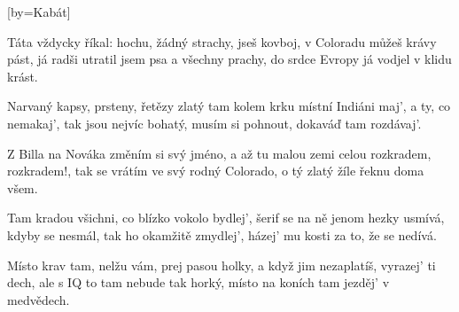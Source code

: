 [by={Kabát}]

\beginverse*{}
   
    
\endverse{}

\beginverse{}
Táta vždycky říkal: hochu, žádný strachy,
jseš kovboj, v Coloradu můžeš krávy pást,
já radši utratil jsem psa a všechny prachy,
do srdce Evropy já vodjel v klidu krást.
\endverse{}

\beginverse{}
Narvaný kapsy, prsteny, řetězy zlatý
tam kolem krku místní Indiáni maj',
a ty, co nemakaj', tak jsou nejvíc bohatý,
musím si pohnout, dokaváď tam rozdávaj'.
\endverse{}

\beginchorus{}
Z Billa na Nováka změním si svý jméno,
a až tu malou zemi celou rozkradem, rozkradem!,
tak se vrátím ve svý rodný Colorado,
o tý zlatý žíle řeknu doma všem.
\endchorus{}

\beginverse{}
Tam kradou všichni, co blízko vokolo bydlej',
šerif se na ně jenom hezky usmívá,
kdyby se nesmál, tak ho okamžitě zmydlej',
házej' mu kosti za to, že se nedívá.
\endverse{}

\beginverse{}
Místo krav tam, nelžu vám, prej pasou holky,
a když jim nezaplatíš, vyrazej' ti dech,
ale s IQ to tam nebude tak horký,
místo na koních tam jezděj' v medvědech.
\endverse{}

\beginchorus{}
\phantom{}
\endchorus{}

\endsong{}
